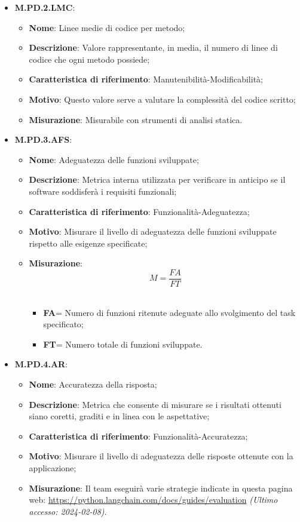 \documentclass[10pt, a4paper]{article}
\begin{document}
\begin{itemize}
 \item \textbf{M.PD.2.LMC}:
    \begin{itemize}
        \item \textbf{Nome}: Linee medie di codice per metodo;
        \item \textbf{Descrizione}: Valore rappresentante, in media, il numero di linee di codice che ogni metodo possiede;
        \item \textbf{Caratteristica di riferimento}: Manutenibilità-Modificabilità;
        \item \textbf{Motivo}: Questo valore serve a valutare la complessità del codice scritto; 
       \item \textbf{Misurazione}: Misurabile con strumenti di analisi statica. \\
    \end{itemize}

     \item \textbf{M.PD.3.AFS}:
    \begin{itemize}
        \item \textbf{Nome}: Adeguatezza delle funzioni sviluppate;
        \item \textbf{Descrizione}: Metrica interna utilizzata per verificare in anticipo se il software soddisferà i requisiti funzionali;
        \item \textbf{Caratteristica di riferimento}: Funzionalità-Adeguatezza;
        \item \textbf{Motivo}: Misurare il livello di adeguatezza delle funzioni sviluppate rispetto alle esigenze specificate; 
       \item \textbf{Misurazione}:   \[ M=\frac{FA}{FT} \] \\
       \begin{itemize}
           \item \textbf{FA}= Numero di funzioni ritenute adeguate allo svolgimento del task specificato;
           \item \textbf{FT}= Numero totale di funzioni sviluppate.\\
       \end{itemize}
    \end{itemize}

  \item \textbf{M.PD.4.AR}:
    \begin{itemize}
        \item \textbf{Nome}: Accuratezza della risposta;
        \item \textbf{Descrizione}: Metrica che consente di misurare se i risultati ottenuti siano coretti, graditi e in linea con le aspettative;
        \item \textbf{Caratteristica di riferimento}: Funzionalità-Accuratezza;
        \item \textbf{Motivo}: Misurare il livello di adeguatezza delle risposte ottenute con la applicazione; 
       \item \textbf{Misurazione}: Il team eseguirà varie strategie indicate in questa pagina web: \url{https://python.langchain.com/docs/guides/evaluation} \textit{(Ultimo accesso: 2024-02-08)}. \\
       

\end{itemize}
\end{itemize}
\end{document}
